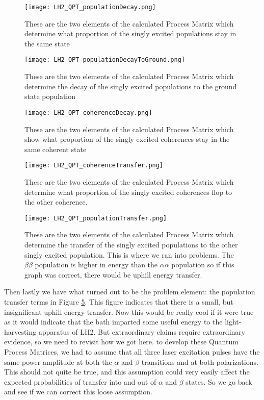 \begin{figure}
   \texttt{[image: LH2\_QPT\_populationDecay.png]}
   \caption{These are the two elements of the calculated Process Matrix which determine what proportion of the singly excited populations stay in the same state}
	\label{fig:LH2_QPT_populationDecay}
\end{figure}

\begin{figure}
   \texttt{[image: LH2\_QPT\_populationDecayToGround.png]}
   \caption{These are the two elements of the calculated Process Matrix which determine the decay of the singly excited populations to the ground state population}
	\label{fig:LH2_QPT_populationDecayToGround}
\end{figure}

\begin{figure}
   \texttt{[image: LH2\_QPT\_coherenceDecay.png]}
   \caption{These are the two elements of the calculated Process Matrix which show what proportion of the singly excited coherences stay in the same coherent state}
	\label{fig:LH2_QPTcoherenceDecay}
\end{figure}

\begin{figure}
   \texttt{[image: LH2\_QPT\_coherenceTransfer.png]}
   \caption{These are the two elements of the calculated Process Matrix which determine what proportion of the singly excited coherences flop to the other coherence.}
	\label{fig:LH2_QPT_coherenceTransfer}
\end{figure}

\begin{figure}
   \texttt{[image: LH2\_QPT\_populationTransfer.png]}
   \caption{These are the two elements of the calculated Process Matrix which determine the transfer of the singly excited populations  to the other singly excited population.  This is where we ran into problems.  The $\beta \beta$ population is higher in energy than the $\alpha \alpha$ population so if this graph was correct, there would be uphill energy transfer.}
	\label{fig:LH2_QPT_populationTransfer}
\end{figure}


Then lastly we have what turned out to be the problem element: the population transfer terms in Figure \ref{fig:LH2_QPT_populationTransfer}.  This figure indicates that there is a small, but insignificant uphill energy transfer.  Now this would be really cool if it were true as it would indicate that the bath imparted some useful energy to the light-harvesting apparatus of LH2.  But extraordinary claims require extraordinary evidence, so we need to revisit how we got here. to develop these Quantum Process Matrices, we had to assume that all three laser excitation pulses have the same power amplitude at both the $\alpha$ and $\beta$ transitions and at both polarizations.  This should not quite be true, and this assumption could very easily affect the expected probabilities of transfer into and out of $\alpha$ and $\beta$ states.  So we go back and see if we can correct this loose assumption.


